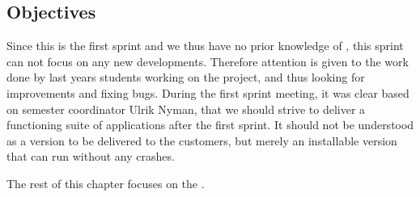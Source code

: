 \subsection{Objectives}\label{sec:sprint1:objectives}
Since this is the first sprint and we thus have no prior knowledge of \giraf, this sprint can not focus on any new developments.
Therefore attention is given to the work done by last years students working on the project, and thus looking for improvements and fixing bugs.
During the first sprint meeting, it was clear based on semester coordinator Ulrik Nyman, that we should strive to deliver a functioning suite of applications after the first sprint.
It should not be understood as a version to be delivered to the customers, but merely an installable version that can run without any crashes. 

The rest of this chapter focuses on the \launcher.











